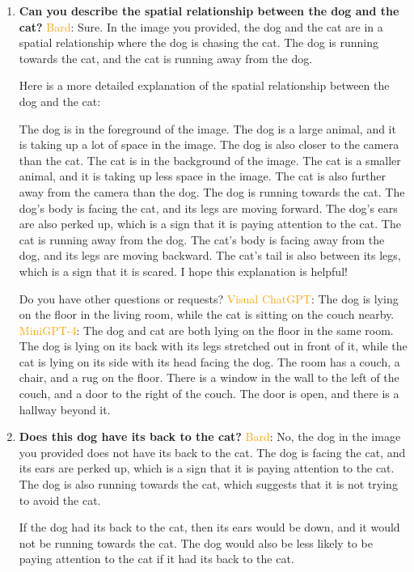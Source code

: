 \begin{enumerate}
    \item \textbf{Can you describe the spatial relationship between the dog and the cat?}
    \subitem \textcolor{orange}{Bard}: Sure. In the image you provided, the dog and the cat are in a spatial relationship where the dog is chasing the cat. The dog is running towards the cat, and the cat is running away from the dog.

    Here is a more detailed explanation of the spatial relationship between the dog and the cat:
    
    The dog is in the foreground of the image. The dog is a large animal, and it is taking up a lot of space in the image. The dog is also closer to the camera than the cat.
    The cat is in the background of the image. The cat is a smaller animal, and it is taking up less space in the image. The cat is also further away from the camera than the dog.
    The dog is running towards the cat. The dog's body is facing the cat, and its legs are moving forward. The dog's ears are also perked up, which is a sign that it is paying attention to the cat.
    The cat is running away from the dog. The cat's body is facing away from the dog, and its legs are moving backward. The cat's tail is also between its legs, which is a sign that it is scared.
    I hope this explanation is helpful!
    
    Do you have other questions or requests?
    \subitem \textcolor{orange}{Visual ChatGPT}: The dog is lying on the floor in the living room, while the cat is sitting on the couch nearby.
    \subitem \textcolor{orange}{MiniGPT-4}: The dog and cat are both lying on the floor in the same room. The dog is lying on its back with its legs stretched out in front of it, while the cat is lying on its side with its head facing the dog. The room has a couch, a chair, and a rug on the floor. There is a window in the wall to the left of the couch, and a door to the right of the couch. The door is open, and there is a hallway beyond it.
    \item \textbf{Does this dog have its back to the cat?}
    \subitem \textcolor{orange}{Bard}: 
    No, the dog in the image you provided does not have its back to the cat. The dog is facing the cat, and its ears are perked up, which is a sign that it is paying attention to the cat. The dog is also running towards the cat, which suggests that it is not trying to avoid the cat.
    
    If the dog had its back to the cat, then its ears would be down, and it would not be running towards the cat. The dog would also be less likely to be paying attention to the cat if it had its back to the cat.
    

\end{enumerate}
